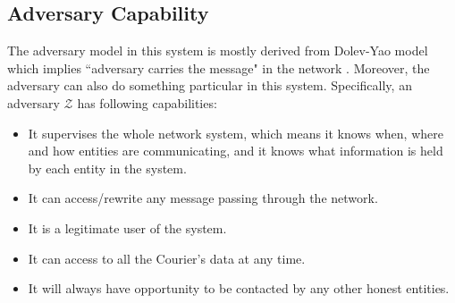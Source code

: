 \subsection{Adversary Capability}
The adversary model in this system is mostly derived from Dolev-Yao model which implies ``adversary carries the message" in the network \cite{Dolev}. Moreover, the adversary can also do something particular in this system. Specifically, an adversary $ \mathcal{Z} $ has following capabilities:
\begin{itemize}
\item It supervises the whole network system, which means it knows when, where and how  entities are communicating, and it knows what information is held by each entity in the system.
\item It can access/rewrite any message passing through the network.
\item It is a legitimate user of the system.
\item It can access to all the Courier's data at any time.
\item It will always have opportunity to be contacted by any other honest entities.
\end{itemize}

